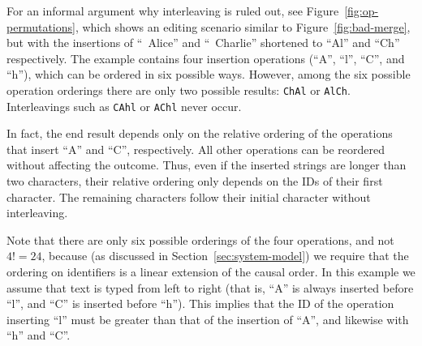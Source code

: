 For an informal argument why interleaving is ruled out, see Figure~\ref{fig:op-permutations}, which shows an editing scenario similar to Figure~\ref{fig:bad-merge}, but with the insertions of ``~Alice'' and ``~Charlie'' shortened to ``Al'' and ``Ch'' respectively.
The example contains four insertion operations (``A'', ``l'', ``C'', and ``h''), which can be ordered in six possible ways.
However, among the six possible operation orderings there are only two possible results: \texttt{ChAl} or \texttt{AlCh}.
Interleavings such as \texttt{CAhl} or \texttt{AChl} never occur.

In fact, the end result depends only on the relative ordering of the operations that insert ``A'' and ``C'', respectively.
All other operations can be reordered without affecting the outcome.
Thus, even if the inserted strings are longer than two characters, their relative ordering only depends on the IDs of their first character.
The remaining characters follow their initial character without interleaving.

Note that there are only six possible orderings of the four operations, and not $4! = 24$, because (as discussed in Section~\ref{sec:system-model}) we require that the ordering on identifiers is a linear extension of the causal order.
In this example we assume that text is typed from left to right (that is, ``A'' is always inserted before ``l'', and ``C'' is inserted before ``h'').
This implies that the ID of the operation inserting ``l'' must be greater than that of the insertion of ``A'', and likewise with ``h'' and ``C''.


